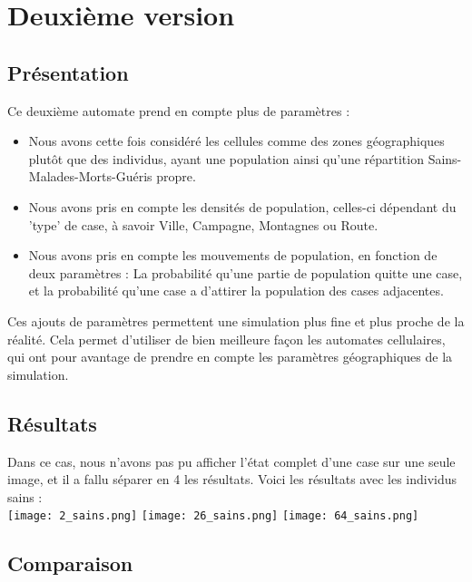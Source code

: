 \documentclass{article}
\begin{document}
	
	
\section{Deuxième version}

\subsection{Présentation}
	Ce deuxième automate prend en compte plus de paramètres : 
	\begin{itemize}
	\item Nous avons cette fois considéré les cellules comme des zones géographiques plutôt que des individus, ayant une population ainsi qu'une répartition Sains-Malades-Morts-Guéris propre.
	\item Nous avons pris en compte les densités de population, celles-ci dépendant du 'type' de case, à savoir Ville, Campagne, Montagnes ou Route.
	\item Nous avons pris en compte les mouvements de population, en fonction de deux paramètres : La probabilité qu'une partie de population quitte une case, et la probabilité qu'une case a d'attirer la population des cases adjacentes.
	\end{itemize}
	
	Ces ajouts de paramètres permettent une simulation plus fine et plus proche de la réalité. Cela permet d'utiliser de bien meilleure façon les automates cellulaires, qui ont pour avantage de prendre en compte les paramètres géographiques de la simulation.


\subsection{Résultats}

Dans ce cas, nous n'avons pas pu afficher l'état complet d'une case sur une seule image, et il a fallu séparer en 4 les résultats. Voici les résultats avec les individus sains : \\[0.6cm]
\texttt{[image: 2\_sains.png]} 
\texttt{[image: 26\_sains.png]} 
\texttt{[image: 64\_sains.png]} 


\subsection{Comparaison}
\end{document}
